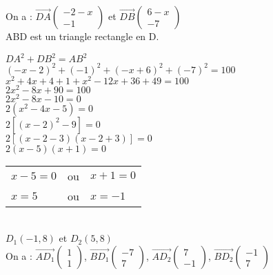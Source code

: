 On a : $\overrightarrow{DA}\left(\begin{array}{c} -2-x\\ -1 \end{array}\right)$ et $\overrightarrow{DB}\left(\begin{array}{c} 6-x\\ -7 \end{array}\right)$\\

ABD est un triangle rectangle en D.

$ DA^2 + DB^2 = AB^2 $\\

$ \left(-x-2\right)^2 + \left(-1\right)^2 + \left(-x + 6\right)^2 + \left(-7\right)^2 = 100 $\\

$ x^2 + 4x + 4 + 1 + x^2 - 12x + 36 + 49 = 100 $\\

$ 2x^2 - 8x + 90 = 100 $\\

$ 2x^2 - 8x - 10 = 0 $\\

$ 2\left(x^2 - 4x - 5\right) = 0 $\\

$ 2\left[\left(x-2\right)^2 - 9\right] = 0 $\\

$ 2 \left[\left(x - 2 - 3\right)\left(x - 2 + 3\right)\right] = 0 $\\

$ 2\left(x-5\right)\left(x + 1 \right) = 0 $\\

\begin{tabular}{lll}
$x-5 = 0$ & ou & $x+1 = 0$ \\
$ x = 5 $ & ou & $x = -1$ \\
\end{tabular}
\\

$ D_1\left(-1,8\right) $ et $D_2\left(5,8\right)$\\

On a : $\overrightarrow{AD_1}\left(\begin{array}{c} 1\\ 1 \end{array}\right)$, $\overrightarrow{BD_1}\left(\begin{array}{c} -7\\ 7 \end{array}\right)$, $\overrightarrow{AD_2}\left(\begin{array}{c} 7\\ -1 \end{array}\right)$, $\overrightarrow{BD_2}\left(\begin{array}{c} -1\\ 7 \end{array}\right)$\\

